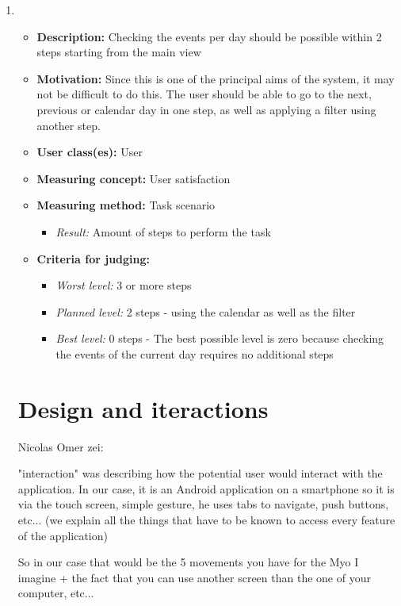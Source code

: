 \documentclass{article}
\begin{document}
\begin{enumerate}
\item 
    \begin{itemize}[label=$ $]
    \item \textbf{Description:} Checking the events per day should be possible within 2 steps starting from the main view
    \item \textbf{Motivation:} Since this is one of the principal aims of the system, it may not be difficult to do this. The user should be able to go to the next, previous or calendar day in one step, as well as applying a filter using another step.
    \item \textbf{User class(es):} User
    \item \textbf{Measuring concept:} User satisfaction
    \item \textbf{Measuring method:} Task scenario
        \begin{itemize}
        \item \textit{Result:} Amount of steps to perform the task
        \end{itemize}
    \item \textbf{Criteria for judging:}
        \begin{itemize}
        \item \textit{Worst level:} 3 or more steps
        \item \textit{Planned level:} 2 steps - using the calendar as well as the filter
        \item \textit{Best level:} 0 steps - The best possible level is zero because checking the events of the current day requires no additional steps
        \end{itemize}
    \end{itemize}


\section{Design and iteractions}
 Nicolas Omer zei:

"interaction" was describing how the potential user would interact with the application. In our case, it is an Android application on a smartphone so it is via the touch screen, simple gesture, he uses tabs to navigate, push buttons, etc... (we explain all the things that have to be known to access every feature of the application)

So in our case that would be the 5 movements you have for the Myo I imagine + the fact that you can use another screen than the one of your computer, etc...


\end{enumerate}
\end{document}
